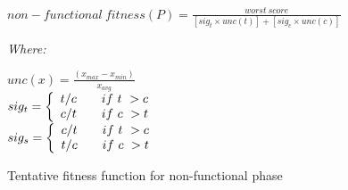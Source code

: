 \begin{figure}[h]
\begin{footnotesize}
\begin{center}
$non-functional\ fitness(P) = \frac{worst\ score}{[sig_t \times unc(t)] + [sig_c \times unc(c)]}$
\end{center}
\vspace{0.1cm} \textit{Where:} \vspace{0.1cm}
\end{footnotesize}
\begin{scriptsize}
\begin{center}
$unc(x) = \frac{(x_{max} - x_{min})}{x_{avg}}$ \\ \vspace{0.2cm}
$
 sig_t = \left\{
 \begin{array}{l l}
   t/c & \quad if\ t\ > c \\
   c/t & \quad if\ c\ > t \\
 \end{array} \right.
$ \\ \vspace{0.2cm}
$
 sig_s = \left\{
 \begin{array}{l l}
   c/t & \quad if\ t\ > c \\
   t/c & \quad if\ c\ > t \\
 \end{array} \right.
$ \\
\end{center}
\end{scriptsize}
\caption{Tentative fitness function for non-functional phase}
\label{fig:nonfunctional_fitness}
\end{figure}
